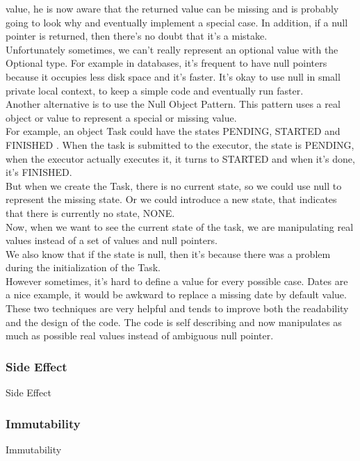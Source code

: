 value, he is now aware that the returned value can be missing and is
probably going to look why and eventually implement a special case.
In addition, if a null pointer is returned, then there's no doubt that
it's a mistake. \\
Unfortunately sometimes, we can't really represent an optional value
with the Optional type.
For example in databases, it's frequent to have null pointers because
it occupies less disk space and it's faster.
It's okay to use null in small private local context, to keep a simple
code and eventually run faster.\\
\newline
Another alternative is to use the Null Object Pattern.
This pattern uses a real object or value to represent a special or
missing value. \\
For example, an object Task could have the states PENDING, STARTED
and FINISHED .
When the task is submitted to the executor, the state is PENDING,
when the executor actually executes it, it turns to STARTED and when
it's done, it's FINISHED. \\
But when we create the Task, there is no current state, so we could use
null to represent the missing state.
Or we could introduce a new state, that indicates that there is currently
no state, NONE. \\
Now, when we want to see the current state of the task, we are
manipulating real values instead of a set of values and null pointers. \\
We also know that if the state is null, then it's because there was
a problem during the initialization of the Task. \\
\newline
However sometimes, it's hard to define a value for every possible case.
Dates are a nice example, it would be awkward to replace a missing date
by default value. \\
\newline
These two techniques are very helpful and tends to improve both the
readability and the design of the code.
The code is self describing and now manipulates as much as possible
real values instead of ambiguous null pointer.

\subsubsection{Side Effect}
Side Effect

\subsubsection{Immutability}
Immutability

